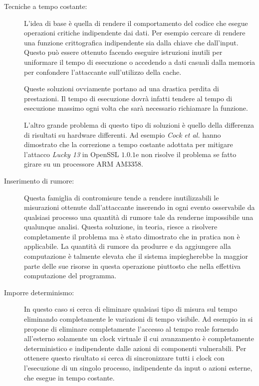 			\begin{description}
				\item[Tecniche a tempo costante:] L'idea di base è quella di rendere il comportamento del codice che esegue operazioni critiche indipendente dai dati. Per esempio cercare di rendere una funzione crittografica indipendente sia dalla chiave che dall'input. Questo può essere ottenuto facendo eseguire istruzioni inutili per uniformare il tempo di esecuzione o accedendo a dati casuali dalla memoria per confondere l'attaccante sull'utilizzo della cache. 
				
				Queste soluzioni ovviamente portano ad una drastica perdita di prestazioni. Il tempo di esecuzione dovrà infatti tendere al tempo di esecuzione massimo ogni volta che sarà necessario richiamare la funzione.
				
				L'altro grande problema di questo tipo di soluzioni è quello della differenza di risultati su hardware differenti. Ad esempio \emph{Cock et al.}\cite{cock2014last} hanno dimostrato che la correzione a tempo costante adottata per mitigare l'attacco \emph{Lucky 13}\cite{al2013lucky} in OpenSSL $1.0.1$e non risolve il problema se fatto girare su un processore ARM AM3358. 
				\item[Inserimento di rumore:] Questa famiglia di contromisure tende a rendere inutilizzabili le misurazioni ottenute dall'attaccante inserendo in ogni evento osservabile da qualsiasi processo una quantità di rumore tale da renderne impossibile una qualunque analisi\cite{hu1992reducing}. Questa soluzione, in teoria, riesce a risolvere completamente il problema ma è stato dimostrato\cite{cock2014last} che in pratica non è applicabile. La quantità di rumore da produrre e da aggiungere alla computazione è talmente elevata che il sistema impiegherebbe la maggior parte delle sue risorse in questa operazione piuttosto che nella effettiva computazione del programma.
				\item[Imporre determinismo:] In questo caso si cerca di eliminare qualsiasi tipo di misura sul tempo eliminando completamente le variazioni di tempo visibile. Ad esempio in \cite{aviram2012efficient} si propone di eliminare completamente l'accesso al tempo reale fornendo all'esterno solamente un clock virtuale il cui avanzamento è completamente deterministico e indipendente dalle azioni di componenti vulnerabili. Per ottenere questo risultato si cerca di sincronizzare tutti i clock con l'esecuzione di un singolo processo, indipendente da input o azioni esterne, che esegue in tempo costante.

\end{description}
